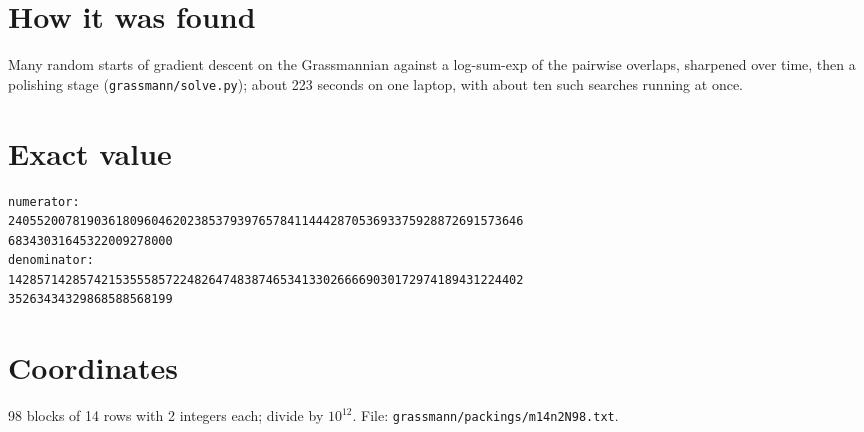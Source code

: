 \documentclass[11pt,a4paper]{article}
\begin{document}
\section{How it was found}
Many random starts of gradient descent on the Grassmannian against a log-sum-exp of the pairwise overlaps, sharpened over time, then a polishing stage (\texttt{grassmann/solve.py}); about 223 seconds on one laptop, with about ten such searches running at once.


\appendix
\section{Exact value}
{\small
\begin{verbatim}
numerator:
240552007819036180960462023853793976578411444287053693375928872691573646
68343031645322009278000
denominator:
142857142857421535558572248264748387465341330266669030172974189431224402
35263434329868588568199
\end{verbatim}}

\section{Coordinates}
98 blocks of 14 rows with 2 integers each; divide by $10^{12}$. File: \texttt{grassmann/packings/m14n2N98.txt}.
{\tiny
\begin{multicols}{4}
\end{multicols}}
\end{document}
